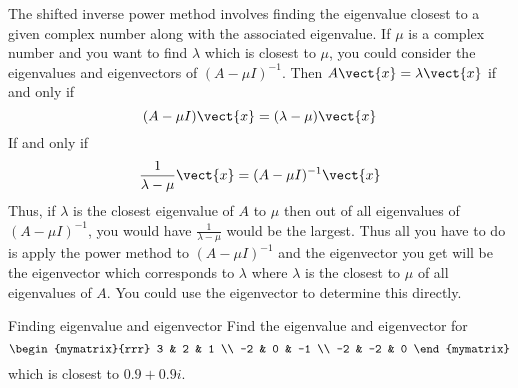 The shifted inverse power method involves finding the eigenvalue closest to
a given complex number along with the associated eigenvalue. If $\mu $ is a
complex number and you want to find $\lambda $ which is closest to $\mu$,
you could consider the eigenvalues and eigenvectors of $(A-\mu
I) ^{-1}$. Then $A\vect{x}=\lambda \vect{x}$ if and only if
\begin{equation*}
(A-\mu I) \vect{x}=(\lambda -\mu) \vect{x}
\end{equation*}
If and only if
\begin{equation*}
\frac{1}{\lambda -\mu }\vect{x}=(A-\mu I) ^{-1}\vect{x}
\end{equation*}
Thus, if $\lambda $ is the closest eigenvalue of $A$ to $\mu $ then out of
all eigenvalues of $(A-\mu I) ^{-1}$, you would have $\frac{1}{
\lambda -\mu }$ would be the largest. Thus all you have to do is apply the
power method to $(A-\mu I) ^{-1}$ and the eigenvector you get
will be the eigenvector which corresponds to $\lambda $ where $\lambda $ is
the closest to $\mu $ of all eigenvalues of $A$. You could use the
eigenvector to determine this directly.

\begin{example}{Finding eigenvalue and eigenvector}{}
Find the eigenvalue and eigenvector for
\begin{equation*}
\begin{mymatrix}{rrr}
3 & 2 & 1 \\
-2 & 0 & -1 \\
-2 & -2 & 0
\end{mymatrix}
\end{equation*}
which is closest to $0.9+0.9i$.
\end{example}

